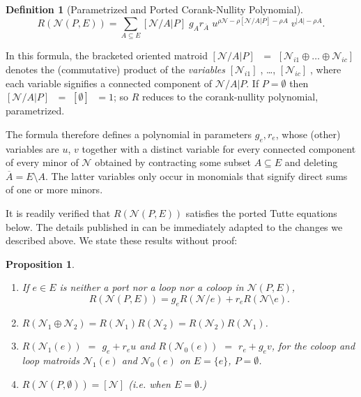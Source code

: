\documentclass[12pt]{article}
\newtheorem{proposition}[theorem]{Proposition}
\theoremstyle{definition}
\newtheorem{definition}[theorem]{Definition}
\newcommand{\MVAR}[1]{{[#1]\;}}
\newcommand{\scomp}[1]{\ensuremath{\overline{#1}}}
\newcommand{\Rank}{{\rho}}%
\newcommand{\Card}[1]{\ensuremath{{\left|#1\right|}}}
\begin{document}
\begin{definition}[Parametrized and Ported Corank-Nullity Polynomial]
\label{definitionRankPoly}
\[
R(\mathcal{N}(P,E))=\sum_{A\subseteq E}
	\MVAR{\mathcal{N}/A|P}g_Ar_{\scomp{A}}\;
	u^{\Rank{\mathcal{N}}-\Rank{[\mathcal{N}/A|P]}-\Rank{A}}\;
	v^{\Card{A}-\Rank{A}}.
\]
\end{definition}

In this formula, the bracketed oriented matroid 
$\MVAR{\mathcal{N}/A|P}$ $=$ 
$\MVAR{\mathcal{N}_{i1}\oplus\ldots\oplus\mathcal{N}_{ic}}$ denotes the
(commutative) product of the \textit{variables}
$\MVAR{\mathcal{N}_{i1}}$,  \ldots, $\MVAR{\mathcal{N}_{ic}}$, where each 
variable signifies a connected component of $\mathcal{N}/A|P$.  If
$P=\emptyset$ then $\MVAR{\mathcal{N}/A|P}$ $=$ 
$\MVAR{\emptyset}$ $= 1$; so
$R$ reduces to the corank-nullity polynomial, parametrized.

The formula 
therefore defines a polynomial in parameters $g_e,r_e$, whose 
(other) variables are $u$, $v$ together with a distinct variable for every
connected component of every minor of $\mathcal{N}$ obtained by
contracting some subset $A\subseteq E$ and deleting
$\scomp{A}=E\setminus A$.  The latter variables only occur
in monomials that signify direct sums of one or more minors.

It is readily verified that $R(\mathcal{N}(P,E))$ satisfies the 
ported Tutte equations below. 
The details
published in \cite{sdcPorted} can be immediately adapted 
to the changes we described above.
We state these results without proof:

\begin{proposition}
\label{RankPolyPortedTutteEq}
\begin{enumerate}
\item 
If $e\in E$ is neither a port nor a loop nor a coloop in $\mathcal{N}(P,E)$,
\begin{equation}
R(\mathcal{N}(P,E)) = g_eR(\mathcal{N}/e) + r_eR(\mathcal{N}\setminus e).
\end{equation}
\item
$R(\mathcal{N}_1\oplus\mathcal{N}_2) = R(\mathcal{N}_1)R(\mathcal{N}_2) =
R(\mathcal{N}_2)R(\mathcal{N}_1)$.
\item $R(\mathcal{N}_1(e))$ $=$ $g_e + r_eu$ and
$R(\mathcal{N}_0(e))$ $=$ $r_e + g_ev$, for the coloop and loop matroids
$\mathcal{N}_1(e)$ and $\mathcal{N}_0(e)$ on $E=\{e\}$, $P=\emptyset$.
\item
$R(\mathcal{N}(P,\emptyset)) = [\mathcal{N}]$ (i.e. when $E=\emptyset$.)
\end{enumerate}
\end{proposition}
\end{document}
